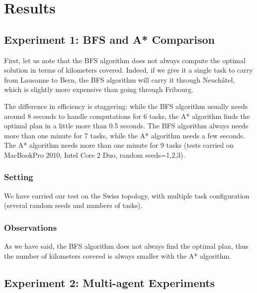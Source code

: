\documentclass[11pt]{article}
\begin{document}
\section{Results}

\subsection{Experiment 1: BFS and A* Comparison}
First, let us note that the BFS algorithm does not always compute the optimal solution in terms of kilometers covered. Indeed, if we give it a single task to carry from Lausanne to Bern, the BFS algorithm will carry it through Neuchâtel, which is slightly more expensive than going through Fribourg.

The difference in efficiency is staggering: while the BFS algorithm usually needs around 8 seconds to handle computations for 6 tasks, the A* algorithm finds the optimal plan in a little more than 0.5 seconds. The BFS algorithm always needs more than one minute for 7 tasks, while the A* algorithm needs a few seconds. The A* algorithm needs more than one minute for 9 tasks (tests carried on MacBookPro 2010, Intel Core 2 Duo, random seeds=1,2,3). 

\subsubsection{Setting}
We have carried our test on the Swiss topology, with multiple task configuration (several random seeds and numbers of tasks).

\subsubsection{Observations}
As we have said, the BFS algorithm does not always find the optimal plan, thus the number of kilometers covered is always smaller with the A* algorithm.

\subsection{Experiment 2: Multi-agent Experiments}
\end{document}
